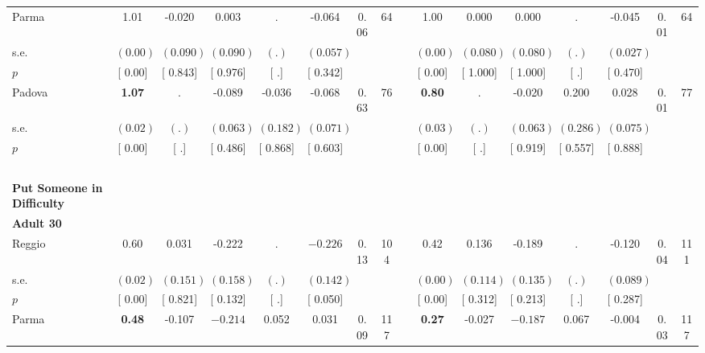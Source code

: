 \begin{longtable}{L{8em} c c c c c c c p{1em} c c c c c c c}
\quad \quad \quad Parma& 1.01 &    -0.020 &     0.003 &         . &    -0.064 &      0.06 &        64 & & 1.00 &     0.000 &     0.000 &         . &    -0.045 &      0.01 &        64  \\*
\quad \quad \quad \quad s.e.& $ (     0.00)$ & $ (    0.090)$ & $ (    0.090)$ & $ (        .)$ & $ (    0.057)$ & & & & $ (     0.00)$ & $ (    0.080)$ & $ (    0.080)$ & $ (        .)$ & $ (    0.027)$ & &  \\*
\quad \quad \quad \quad $ p$ & [     0.00] & [    0.843] & [    0.976] & [        .] & [    0.342] & & & & [     0.00] & [    1.000] & [    1.000] & [        .] & [    0.470] & &  \\[1em]
\quad \quad \quad Padova& \textbf{     1.07} &         . &    -0.089 &    -0.036 &    -0.068 &      0.63 &        76 & & \textbf{     0.80} &         . &    -0.020 &     0.200 &     0.028 &      0.01 &        77  \\*
\quad \quad \quad \quad s.e.& $ (     0.02)$ & $ (        .)$ & $ (    0.063)$ & $ (    0.182)$ & $ (    0.071)$ & & & & $ (     0.03)$ & $ (        .)$ & $ (    0.063)$ & $ (    0.286)$ & $ (    0.075)$ & &  \\*
\quad \quad \quad \quad $ p$ & [     0.00] & [        .] & [    0.486] & [    0.868] & [    0.603] & & & & [     0.00] & [        .] & [    0.919] & [    0.557] & [    0.888] & &  \\[1em]
~\\[1em]
\textbf{Put Someone in Difficulty} \\*
\quad \quad \textbf{Adult 30} & & & & & & & & & & & & & & & \\* 
\quad \quad \quad Reggio& 0.60 &     0.031 &    -0.222 &         . & $ \mathbf{   -0.226}$ &      0.13 &       104 & & 0.42 &     0.136 &    -0.189 &         . &    -0.120 &      0.04 &       111  \\*
\quad \quad \quad \quad s.e.& $ (     0.02)$ & $ (    0.151)$ & $ (    0.158)$ & $ (        .)$ & $ (    0.142)$ & & & & $ (     0.00)$ & $ (    0.114)$ & $ (    0.135)$ & $ (        .)$ & $ (    0.089)$ & &  \\*
\quad \quad \quad \quad $ p$ & [     0.00] & [    0.821] & [    0.132] & [        .] & [    0.050] & & & & [     0.00] & [    0.312] & [    0.213] & [        .] & [    0.287] & &  \\[1em]
\quad \quad \quad Parma& \textbf{     0.48} &    -0.107 & $ \mathbf{   -0.214}$ &     0.052 &     0.031 &      0.09 &       117 & & \textbf{     0.27} &    -0.027 & $ \mathbf{   -0.187}$ &     0.067 &    -0.004 &      0.03 &       117  \\*

\end{longtable}
